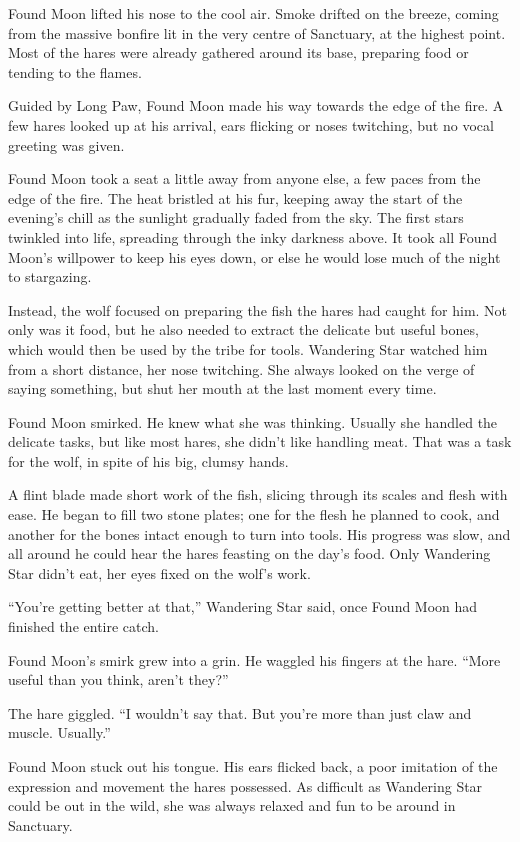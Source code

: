 Found Moon lifted his nose to the cool air. Smoke drifted on the breeze, coming from the massive bonfire lit in the very centre of Sanctuary, at the highest point. Most of the hares were already gathered around its base, preparing food or tending to the flames.

Guided by Long Paw, Found Moon made his way towards the edge of the fire. A few hares looked up at his arrival, ears flicking or noses twitching, but no vocal greeting was given.

Found Moon took a seat a little away from anyone else, a few paces from the edge of the fire. The heat bristled at his fur, keeping away the start of the evening's chill as the sunlight gradually faded from the sky. The first stars twinkled into life, spreading through the inky darkness above. It took all Found Moon's willpower to keep his eyes down, or else he would lose much of the night to stargazing.

Instead, the wolf focused on preparing the fish the hares had caught for him. Not only was it food, but he also needed to extract the delicate but useful bones, which would then be used by the tribe for tools. Wandering Star watched him from a short distance, her nose twitching. She always looked on the verge of saying something, but shut her mouth at the last moment every time.

Found Moon smirked. He knew what she was thinking. Usually she handled the delicate tasks, but like most hares, she didn't like handling meat. That was a task for the wolf, in spite of his big, clumsy hands.

A flint blade made short work of the fish, slicing through its scales and flesh with ease. He began to fill two stone plates; one for the flesh he planned to cook, and another for the bones intact enough to turn into tools. His progress was slow, and all around he could hear the hares feasting on the day's food. Only Wandering Star didn't eat, her eyes fixed on the wolf's work.

``You're getting better at that,'' Wandering Star said, once Found Moon had finished the entire catch.

Found Moon's smirk grew into a grin. He waggled his fingers at the hare. ``More useful than you think, aren't they?''

The hare giggled. ``I wouldn't say that. But you're more than just claw and muscle. Usually.''

Found Moon stuck out his tongue. His ears flicked back, a poor imitation of the expression and movement the hares possessed. As difficult as Wandering Star could be out in the wild, she was always relaxed and fun to be around in Sanctuary.

